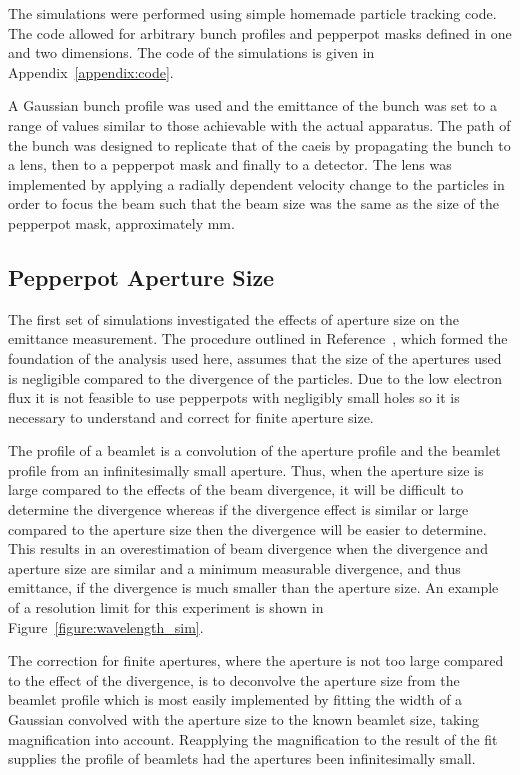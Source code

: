 The simulations were performed using simple homemade particle tracking code.
The code allowed for arbitrary bunch profiles and pepperpot masks defined in one and two dimensions.
The code of the simulations is given in Appendix~\ref{appendix:code}.

A Gaussian bunch profile was used and the emittance of the bunch was set to a range of values similar to those achievable with the actual apparatus.
The path of the bunch was designed to replicate that of the \gls{caeis} by propagating the bunch to a lens, then to a pepperpot mask and finally to a detector.
The lens was implemented by applying a radially dependent velocity change to the particles in order to focus the beam such that the beam size was the same as the size of the pepperpot mask, approximately \unit[2]{mm}.

\subsection{Pepperpot Aperture Size}

The first set of simulations investigated the effects of aperture size on the emittance measurement.
The procedure outlined in Reference~\cite{zhang_emittance_1996}, which formed the foundation of the analysis used here, assumes that the size of the apertures used is negligible compared to the divergence of the particles.
Due to the low electron flux it is not feasible to use pepperpots with negligibly small holes so it is necessary to understand and correct for finite aperture size.

The profile of a beamlet is a convolution of the aperture profile and the beamlet profile from an infinitesimally small aperture.
Thus, when the aperture size is large compared to the effects of the beam divergence, it will be difficult to determine the divergence whereas if the divergence effect is similar or large compared to the aperture size then the divergence will be easier to determine.
This results in an overestimation of beam divergence when the divergence and aperture size are similar and a minimum measurable divergence, and thus emittance, if the divergence is much smaller than the aperture size.
An example of a resolution limit for this experiment is shown in Figure~\ref{figure:wavelength_sim}.

The correction for finite apertures, where the aperture is not too large compared to the effect of the divergence, is to deconvolve the aperture size from the beamlet profile which is most easily implemented by fitting the width of a Gaussian convolved with the aperture size to the known beamlet size, taking magnification into account.
Reapplying the magnification to the result of the fit supplies the profile of beamlets had the apertures been infinitesimally small.

